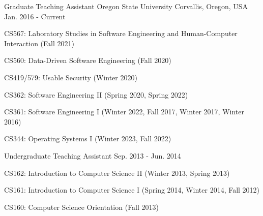 
\begin{cventries}

  \cventry
    {Graduate Teaching Assistant} %
    {Oregon State University} %
    {Corvallis, Oregon, USA} %
    {Jan. 2016 - Current} %
    {
      \begin{cvitems} %
        \item {CS567: Laboratory Studies in Software Engineering and Human-Computer Interaction (Fall 2021)}
        \item {CS560: Data-Driven Software Engineering (Fall 2020)}
        \item {CS419/579: Usable Security (Winter 2020)}
        \item {CS362: Software Engineering II (Spring 2020, Spring 2022)}
        \item {CS361: Software Engineering I (Winter 2022, Fall 2017, Winter 2017, Winter 2016)}
        \item {CS344: Operating Systems I (Winter 2023, Fall 2022)}
      \end{cvitems}
    }

    \cventry
    {Undergraduate Teaching Assistant} %
    {} %
    {} %
    {Sep. 2013 - Jun. 2014} %
    {
      \begin{cvitems} %
        \item {CS162: Introduction to Computer Science II (Winter 2013, Spring 2013)}
        \item {CS161: Introduction to Computer Science I (Spring 2014, Winter 2014, Fall 2012)}
        \item {CS160: Computer Science Orientation (Fall 2013)}
      \end{cvitems}
    }

\end{cventries}
